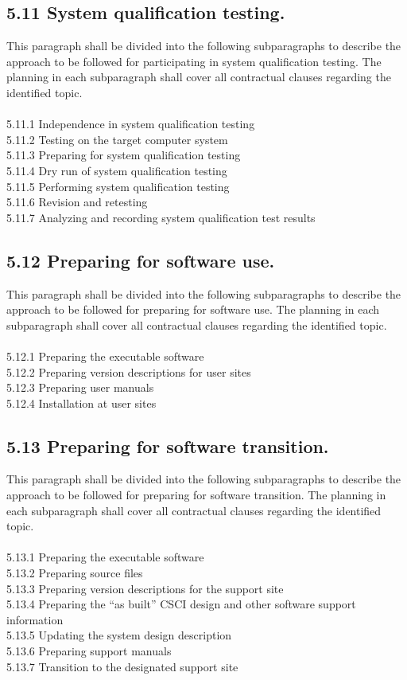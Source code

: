 \subsection{5.11 System qualification testing.}

This paragraph shall be divided into the following subparagraphs to
describe the approach to be followed for participating in system
qualification testing. The planning in each subparagraph shall cover all
contractual clauses regarding the identified topic. \\\\ 5.11.1
Independence in system qualification testing \\ 5.11.2 Testing on the
target computer system \\ 5.11.3 Preparing for system qualification
testing \\ 5.11.4 Dry run of system qualification testing \\ 5.11.5
Performing system qualification testing \\ 5.11.6 Revision and retesting
\\ 5.11.7 Analyzing and recording system qualification test results

\subsection{5.12 Preparing for software use.}

This paragraph shall be divided into the following subparagraphs to
describe the approach to be followed for preparing for software use. The
planning in each subparagraph shall cover all contractual clauses
regarding the identified topic. \\\\ 5.12.1 Preparing the executable
software \\ 5.12.2 Preparing version descriptions for user sites \\
5.12.3 Preparing user manuals \\ 5.12.4 Installation at user sites

\subsection{5.13 Preparing for software transition.}

This paragraph shall be divided into the following subparagraphs to
describe the approach to be followed for preparing for software
transition. The planning in each subparagraph shall cover all
contractual clauses regarding the identified topic. \\\\ 5.13.1
Preparing the executable software \\ 5.13.2 Preparing source files \\
5.13.3 Preparing version descriptions for the support site \\ 5.13.4
Preparing the ``as built'' CSCI design and other software support
information \\ 5.13.5 Updating the system design description \\ 5.13.6
Preparing support manuals \\ 5.13.7 Transition to the designated support
site

